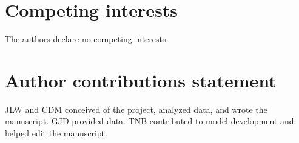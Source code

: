 \documentclass[webpdf,large,modern,unnumsec,namedate]{oup-authoring-template}
\begin{document}
\section{Competing interests}

The authors declare no competing interests.

\section{Author contributions statement}

JLW and CDM conceived of the project, analyzed data, and wrote the
manuscript. GJD provided data. TNB contributed to model development and
helped edit the manuscript.


\renewcommand\refname{References}




\end{document}

